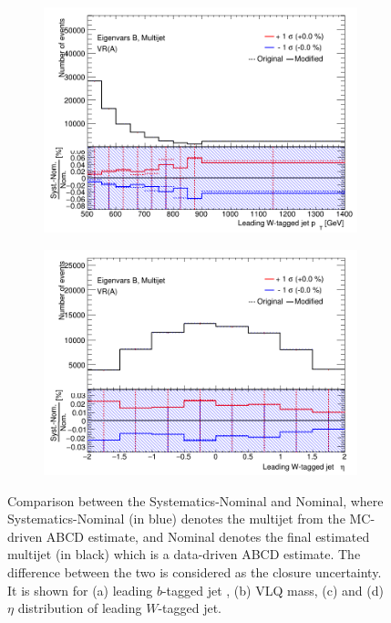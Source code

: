 \begin{figure}[hbt!]
\begin{subfigure}{.35\textwidth}
		\centering
		\includegraphics[width=\linewidth,height=\textheight,keepaspectratio]{VR_B_ljet_pt_Multijets.png}
		\caption{}
		\label{fig:uncertainties:systematics:closure:ljetpt}
	\end{subfigure}\hspace{0.6cm}
	\begin{subfigure}{.35\textwidth}
		\centering
		\includegraphics[width=\linewidth,height=\textheight,keepaspectratio]{VR_B_ljet_eta_Multijets.png}
		\caption{}
		\label{fig:uncertainties:systematics:closure:ljeteta}
	\end{subfigure}
	\caption{Comparison between the Systematics-Nominal and Nominal, where Systematics-Nominal (in blue) denotes the multijet from the MC-driven ABCD estimate, and Nominal denotes the final estimated multijet (in black) which is a data-driven ABCD estimate. The difference between the two is considered as the closure uncertainty. It is shown for (a) leading $b$-tagged jet \pt, (b) VLQ mass, (c) \pt and (d) $\eta$ distribution of leading $W$-tagged jet.}
	\label{fig:uncertainties:systematics:closure}
\end{figure}

